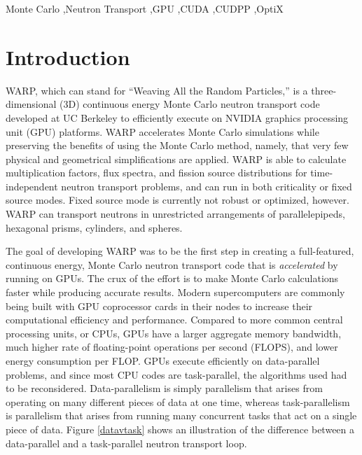 \documentclass[preprint,12pt]{elsarticle}
\begin{document}
\begin{frontmatter}
\begin{abstract}
\end{abstract}

\begin{keyword}
Monte Carlo \sep Neutron Transport \sep GPU \sep CUDA \sep CUDPP \sep OptiX


\end{keyword}

\end{frontmatter}

\linenumbers


\section{Introduction}
\label{sec:intro}

WARP, which can stand for ``Weaving All the Random Particles,'' is a three-dimensional (3D) continuous energy Monte Carlo neutron transport code developed at UC Berkeley to efficiently execute on NVIDIA graphics processing unit (GPU) platforms.  WARP accelerates Monte Carlo simulations while preserving the benefits of using the Monte Carlo method, namely, that very few physical and geometrical simplifications are applied.  WARP is able to calculate multiplication factors, flux spectra, and fission source distributions for time-independent neutron transport problems, and can run in both criticality or fixed source modes. Fixed source mode is currently not robust or optimized, however.  WARP can transport neutrons in unrestricted arrangements of parallelepipeds, hexagonal prisms, cylinders, and spheres.

The goal of developing WARP was to be the first step in creating a full-featured, continuous energy, Monte Carlo neutron transport code that is \emph{accelerated} by running on GPUs.  The crux of the effort is to make Monte Carlo calculations faster while producing accurate results.  Modern supercomputers are commonly being built with GPU coprocessor cards in their nodes to increase their computational efficiency and performance.  Compared to more common central processing units, or CPUs, GPUs have a larger aggregate memory bandwidth, much higher rate of floating-point operations per second (FLOPS), and lower energy consumption per FLOP.  GPUs execute efficiently on data-parallel problems, and since most CPU codes are task-parallel, the algorithms used had to be reconsidered.  Data-parallelism is simply parallelism that arises from operating on many different pieces of data at one time, whereas task-parallelism is parallelism that arises from running many concurrent tasks that act on a single piece of data.   Figure \ref{datavtask} shows an illustration of the difference between a data-parallel and a task-parallel neutron transport loop.
\end{document}
